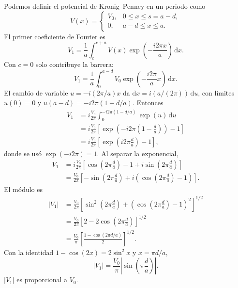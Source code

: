 \documentclass[reprint, amsmath, amssymb, aps, prb]{revtex4-2}
\begin{document}
\begin{appendices}
Podemos definir el potencial de Kronig--Penney en un periodo como
\begin{equation}
V(x)=
\begin{cases}
V_0, & 0\leq x\leq s=a-d,\\
0, & a-d\leq x\leq a.
\end{cases}
\end{equation}
El primer coeficiente de Fourier es
\begin{equation}
V_1=\frac{1}{a}\int_{c}^{c+a}
V(x)\exp\left(-\frac{i 2\pi x}{a}\right)\,\mathrm{d}x.
\end{equation}
Con $c=0$ solo contribuye la barrera:
\begin{equation}
V_1=\frac{1}{a}\int_{0}^{a-d}
V_0\exp\left(-\frac{i 2\pi}{a}x\right)\,\mathrm{d}x.
\end{equation}
El cambio de variable $u=-i(2\pi/a)x$ da
$\mathrm{d}x=i(a/(2\pi))\,\mathrm{d}u$, con límites $u(0)=0$ y
$u(a-d)=-i 2\pi(1-d/a)$. Entonces
\begin{align}
V_1
&= i\frac{V_0}{2\pi}
\int_{0}^{-i 2\pi(1-d/a)}\exp(u)\,\mathrm{d}u \nonumber\\
&= i\frac{V_0}{2\pi}
\left[\exp\left(-i 2\pi\left(1-\frac{d}{a}\right)\right)-1\right] \nonumber\\
&= i\frac{V_0}{2\pi}
\left[\exp\left(i 2\pi\frac{d}{a}\right)-1\right],
\end{align}
donde se usó $\exp(-i 2\pi)=1$. Al separar la exponencial,
\begin{align}
V_1
&= i\frac{V_0}{2\pi}
\left[\cos\left(2\pi\frac{d}{a}\right)-1
+i\sin\left(2\pi\frac{d}{a}\right)\right] \nonumber\\
&= \frac{V_0}{2\pi}
\left[-\sin\left(2\pi\frac{d}{a}\right)
+i\left(\cos\left(2\pi\frac{d}{a}\right)-1\right)\right].
\end{align}
El módulo es
\begin{align}
|V_1|
&= \frac{V_0}{2\pi}
\left[
\sin^{2}\left(2\pi\frac{d}{a}\right)
+\left(\cos\left(2\pi\frac{d}{a}\right)-1\right)^{2}
\right]^{1/2} \nonumber\\
&= \frac{V_0}{2\pi}
\left[2-2\cos\left(2\pi\frac{d}{a}\right)\right]^{1/2} \nonumber\\
&= \frac{V_0}{\pi}
\left[\frac{1-\cos(2\pi d/a)}{2}\right]^{1/2}.
\end{align}
Con la identidad $1-\cos(2x)=2\sin^{2}x$ y $x=\pi d/a$,
\begin{equation}
|V_1|=\frac{V_0}{\pi}\left|\sin\left(\pi\frac{d}{a}\right)\right|.
\label{eq:V1ap}
\end{equation}
$|V_1|$ es proporcional a $V_0$.



\end{appendices}
\end{document}
